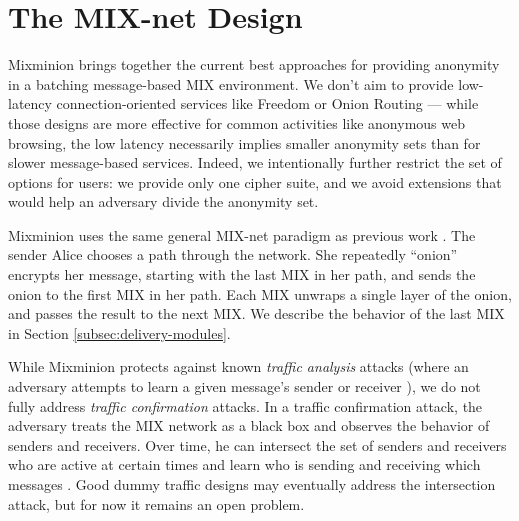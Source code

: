 \documentclass{llncs}
\begin{document}

\section{The MIX-net Design}
\label{sec:design}

Mixminion brings together the current best approaches for providing
anonymity in a batching message-based MIX environment. We don't aim
to provide low-latency connection-oriented services like Freedom
\cite{freedom} or Onion Routing \cite{goldschlag99} --- while those
designs are more effective for common activities like anonymous web
browsing, the low latency necessarily implies smaller anonymity sets
than for slower message-based services. Indeed, we intentionally
further restrict the set of options for users: we provide only one
cipher suite, and we avoid extensions that would help an adversary
divide the anonymity set.

Mixminion uses the same general MIX-net paradigm as previous work
\cite{chaum-mix,mixmaster-attacks,babel}. The sender Alice chooses a
path through the network. She repeatedly ``onion'' encrypts her message,
starting with the last
MIX in her path, and sends the onion to the first MIX in her path. Each
MIX unwraps a single layer of the onion, and passes the result to the
next MIX. We describe the behavior of the last MIX in
Section \ref{subsec:delivery-modules}.


While Mixminion protects against known \emph{traffic analysis} attacks
(where an adversary attempts to learn a given message's sender or
receiver \cite{rackoff93cryptographic,raymond00}), we do not fully
address \emph{traffic confirmation} attacks. In a traffic confirmation
attack, the adversary treats the MIX network as a black box and
observes the behavior of senders and receivers. Over time, he can
intersect the set of senders and receivers who are active at certain
times and learn who is sending and receiving which messages
\cite{langos02}. Good dummy traffic designs may eventually address the
intersection attack, but for now it remains an open problem.
\end{document}
